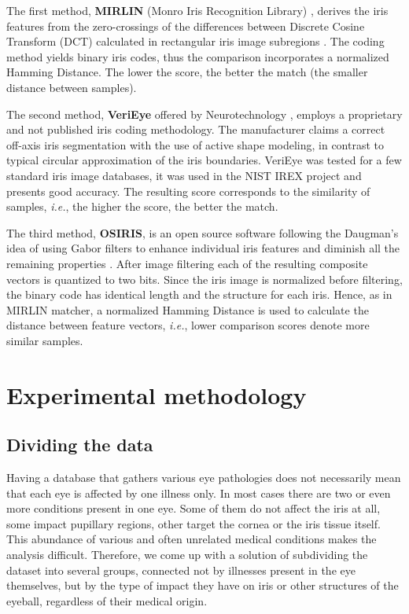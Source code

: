 \documentclass[conference]{IEEEtran}
\begin{document}
The first method, {\bf MIRLIN} (Monro Iris Recognition Library) \cite{MIRLIN}, derives the iris features from the zero-crossings of the differences between Discrete Cosine Transform (DCT) calculated in rectangular iris image subregions \cite{MIRLINpaper}. The coding method yields binary iris codes, thus the comparison incorporates a normalized Hamming Distance. The lower the score, the better the match (the smaller distance between samples). 


The second method, {\bf VeriEye} offered by Neurotechnology \cite{VeriEye}, employs a proprietary and not published iris coding methodology. The manufacturer claims a correct off-axis iris segmentation with the use of active shape modeling, in contrast to typical circular approximation of the iris boundaries. VeriEye was tested for a few standard iris image databases, it was used in the NIST IREX project and presents good accuracy. The resulting score corresponds to the similarity of samples, \emph{i.e.}, the higher the score, the better the match.

The third method, {\bf OSIRIS}, is an open source software following the Daugman's idea of using Gabor filters to enhance individual iris features and diminish all the remaining properties \cite{OSIRIS}. After image filtering each of the resulting composite vectors is quantized to two bits. Since the iris image is normalized before filtering, the binary code has identical length and the structure for each iris. Hence, as in MIRLIN matcher, a normalized Hamming Distance is used to calculate the distance between feature vectors, \emph{i.e.}, lower comparison scores denote more similar samples.


\section{Experimental methodology}
\label{sec:expmethodology}

\subsection{Dividing the data}
\label{section:dividing}
Having a database that gathers various eye pathologies does not necessarily mean that each eye is affected by one illness only. In most cases there are two or even more conditions present in one eye. Some of them do not affect the iris at all, some impact pupillary regions, other target the cornea or the iris tissue itself. This abundance of various and often unrelated medical conditions makes the analysis difficult. Therefore, we come up with a solution of subdividing the dataset into several groups, connected not by illnesses present in the eye themselves, but by the type of impact they have on iris or other structures of the eyeball, regardless of their medical origin.
\end{document}
